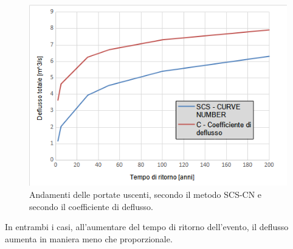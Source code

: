 \begin{figure}[H]  \centering
    \includegraphics[scale=0.75]{immagini/metodo_razionale_cn_c.png}
    \caption{Andamenti delle portate uscenti, secondo il metodo SCS-CN e secondo il coefficiente di deflusso.}
    \label{metodo_razionale_cn_c}
\end{figure}
In entrambi i casi, all'aumentare del tempo di ritorno dell'evento, il deflusso aumenta in maniera meno che proporzionale.

